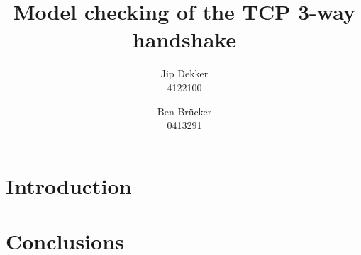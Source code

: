 \documentclass[11pt,a4paper]{article}
\author{Jip Dekker\\4122100 \and Ben Br\"ucker\\0413291}
\title{Model checking of the TCP 3-way handshake}
\begin{document}
\maketitle

\section*{Introduction}


\section*{Conclusions}
\end{document}
